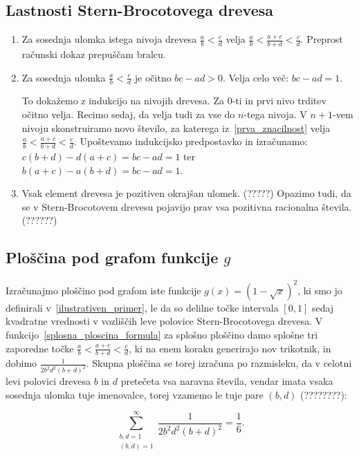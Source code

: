\documentclass[a4paper, 12pt, titlepage]{article}
\begin{document}
\subsection{Lastnosti Stern-Brocotovega drevesa}

\begin{enumerate}
    \item \label{prva_znacilnost}
    Za sosednja ulomka istega nivoja drevesa $ \frac{a}{b} < \frac{c}{d} $ velja $ \frac{a}{b} < \frac{a+c}{b+d} < \frac{c}{d} $. Preprost računski dokaz prepuščam bralcu.
    \item Za sosednja ulomka $ \frac{a}{b} < \frac{c}{d} $ je očitno $ bc - ad > 0 $. Velja celo več: $ bc - ad = 1 $.
    
    To dokažemo z indukcijo na nivojih drevesa. Za 0-ti in prvi nivo trditev očitno velja. Recimo sedaj, da velja tudi za vse do $ n $-tega nivoja. V $ n+1$-vem nivoju skonstruiramo novo število, za katerega iz~\ref{prva_znacilnost} velja $ \frac{a}{b} < \frac{a+c}{b+d} < \frac{c}{d} $. Upoštevamo indukcijsko predpostavko in izračunamo: $ c(b+d) - d(a+c) = bc-ad = 1 $ ter $ b(a+c) - a(b+d)  = bc-ad = 1 $.
    \item Vsak element drevesa je pozitiven okrajšan ulomek. (?????) Opazimo tudi, da se v Stern-Brocotovem drevesu pojavijo prav vsa pozitivna racionalna števila. (??????)
\end{enumerate}

\subsection{Ploščina pod grafom funkcije $ g $}

Izračunajmo ploščino pod grafom iste funkcije $ g(x) = (1 - \sqrt{x})^2 $, ki smo jo definirali v~\ref{ilustrativen_primer}, le da so delilne točke intervala $ [0,1] $ sedaj kvadratne vrednosti v vozliščih leve polovice Stern-Brocotovega drevesa. V funkcijo~\ref{splosna_ploscina_formula} za splošno ploščino damo splošne tri zaporedne točke $ \frac{a}{b} < \frac{a+c}{b+d} < \frac{c}{d} $, ki na enem koraku generirajo nov trikotnik, in dobimo $ \frac{1}{2b^2d^2(b+d)^2} $. Skupna ploščina se torej izračuna po razmisleku, da v celotni levi polovici drevesa $ b $ in $ d $ pretečeta vsa naravna števila, vendar imata vsaka sosednja ulomka tuje imenovalce, torej vzamemo le tuje pare $ (b,d) $ (????????):

\begin{equation}
    \sum_{\substack{b,d=1 \\ (b,d)=1}}^{\infty} \frac{1}{2b^2d^2(b+d)^2} = \frac{1}{6}\text{.}
    \label{SB_ilustrativen_primer}
\end{equation}
\end{document}
